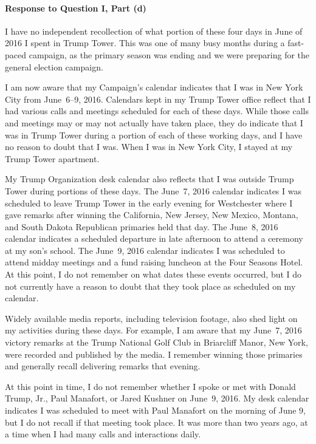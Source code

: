 \paragraph*{Response to Question I, Part (d)}

I have no independent recollection of what portion of these four days in June of 2016 I spent in Trump Tower.
This was one of many busy months during a fast-paced campaign, as the primary season was ending and we were preparing for the general election campaign.

I am now aware that my Campaign's calendar indicates that I was in New York City from June~6--9, 2016.
Calendars kept in my Trump Tower office reflect that I had various calls and meetings scheduled for each of these days.
While those calls and meetings may or may not actually have taken place, they do indicate that I was in Trump Tower during a portion of each of these working days, and I have no reason to doubt that I was.
When I was in New York City, I stayed at my Trump Tower apartment.

My Trump Organization desk calendar also reflects that I was outside Trump Tower during portions of these days.
The June~7, 2016 calendar indicates I was scheduled to leave Trump Tower in the early evening for Westchester where I gave remarks after winning the California, New Jersey, New Mexico, Montana, and South Dakota Republican primaries held that day.
The June~8, 2016 calendar indicates a scheduled departure in late afternoon to attend a ceremony at my son's school.
The June~9, 2016 calendar indicates I was scheduled to attend midday meetings and a fund raising luncheon at the Four Seasons Hotel.
At this point, I do not remember on what dates these events occurred, but I do not currently have a reason to doubt that they took place as scheduled on my calendar.

Widely available media reports, including television footage, also shed light on my activities during these days.
For example, I am aware that my June~7, 2016 victory remarks at the Trump National Golf Club in Briarcliff Manor, New York, were recorded and published by the media.
I remember winning those primaries and generally recall delivering remarks that evening.

At this point in time, I do not remember whether I spoke or met with Donald Trump, Jr., Paul Manafort, or Jared Kushner on June~9, 2016.
My desk calendar indicates I was scheduled to meet with Paul Manafort on the morning of June 9, but I do not recall if that meeting took place.
It was more than two years ago, at a time when I had many calls and interactions daily.

